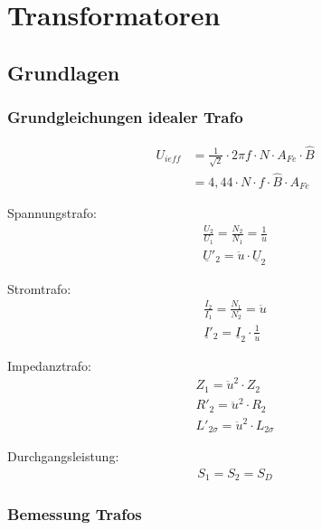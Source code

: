 \section{Transformatoren}
	\subsection{Grundlagen}
	\subsubsection{Grundgleichungen idealer Trafo}

    \vspace{-1em}
    \begin{align*}
        U_{ieff} &= \frac{1}{\sqrt{2}} \cdot 2 \pi f \cdot N \cdot A_{Fe} \cdot
        \hat{B}\\ &= 4,44 \cdot N \cdot f \cdot \hat{B} \cdot A_{Fe}
    \end{align*}

    Spannungstrafo:
    \begin{gather*}
        \frac{U_{2}}{U_{1}} = \frac{N_{2}}{N_{1}} = \frac{1}{\ddot{u}} \\
        \underline{U}'_{2}  = \ddot{u} \cdot \underline{U}_{2}
    \end{gather*}

    Stromtrafo:
    \begin{gather*}
        \frac{I_{2}}{I_{1}} = \frac{N_{1}}{N_{2}} = \ddot{u}\\
        \underline{I}'_{2} = \underline{I}_{2} \cdot \frac{1}{\ddot{u}}
    \end{gather*}

    Impedanztrafo:
    \begin{gather*}
        Z_{1} = \ddot{u}^2 \cdot Z_{2}\\
        R'_{2} = \ddot{u}^2 \cdot R_{2}\\
        L'_{2\sigma} = \ddot{u}^2 \cdot L_{2\sigma}
    \end{gather*}

    Durchgangsleistung:
    \begin{gather*}
        S_{1} = S_{2} = S_{D}
    \end{gather*}

	\subsubsection{Bemessung Trafos}

